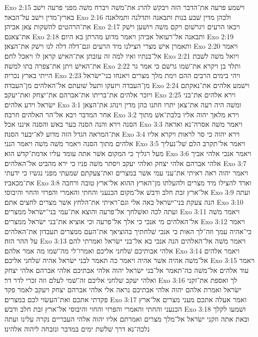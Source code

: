 Exo 2:15  וישׁמע פרעה את־הדבר הזה ויבקשׁ להרג את־משׁה ויברח משׁה מפני פרעה וישׁב בארץ־מדין וישׁב על־הבאר׃
Exo 2:16  ולכהן מדין שׁבע בנות ותבאנה ותדלנה ותמלאנה את־הרהטים להשׁקות צאן אביהן׃
Exo 2:17  ויבאו הרעים ויגרשׁום ויקם משׁה ויושׁען וישׁק את־צאנם׃
Exo 2:18  ותבאנה אל־רעואל אביהן ויאמר מדוע מהרתן בא היום׃
Exo 2:19  ותאמרן אישׁ מצרי הצילנו מיד הרעים וגם־דלה דלה לנו וישׁק את־הצאן׃
Exo 2:20  ויאמר אל־בנתיו ואיו למה זה עזבתן את־האישׁ קראן לו ויאכל לחם׃
Exo 2:21  ויואל משׁה לשׁבת את־האישׁ ויתן את־צפרה בתו למשׁה׃
Exo 2:22  ותלד בן ויקרא את־שׁמו גרשׁם כי אמר גר הייתי בארץ נכריה׃
Exo 2:23  ויהי בימים הרבים ההם וימת מלך מצרים ויאנחו בני־ישׂראל מן־העבדה ויזעקו ותעל שׁועתם אל־האלהים מן־העבדה׃
Exo 2:24  וישׁמע אלהים את־נאקתם ויזכר אלהים את־בריתו את־אברהם את־יצחק ואת־יעקב׃
Exo 2:25  וירא אלהים את־בני ישׂראל וידע אלהים׃
Exo 3:1  ומשׁה היה רעה את־צאן יתרו חתנו כהן מדין וינהג את־הצאן אחר המדבר ויבא אל־הר האלהים חרבה׃
Exo 3:2  וירא מלאך יהוה אליו בלבת־אשׁ מתוך הסנה וירא והנה הסנה בער באשׁ והסנה איננו אכל׃
Exo 3:3  ויאמר משׁה אסרה־נא ואראה את־המראה הגדל הזה מדוע לא־יבער הסנה׃
Exo 3:4  וירא יהוה כי סר לראות ויקרא אליו אלהים מתוך הסנה ויאמר משׁה משׁה ויאמר הנני׃
Exo 3:5  ויאמר אל־תקרב הלם שׁל־נעליך מעל רגליך כי המקום אשׁר אתה עומד עליו אדמת־קדשׁ הוא׃
Exo 3:6  ויאמר אנכי אלהי אביך אלהי אברהם אלהי יצחק ואלהי יעקב ויסתר משׁה פניו כי ירא מהביט אל־האלהים׃
Exo 3:7  ויאמר יהוה ראה ראיתי את־עני עמי אשׁר במצרים ואת־צעקתם שׁמעתי מפני נגשׂיו כי ידעתי את־מכאביו׃
Exo 3:8  וארד להצילו מיד מצרים ולהעלתו מן־הארץ ההוא אל־ארץ טובה ורחבה אל־ארץ זבת חלב ודבשׁ אל־מקום הכנעני והחתי והאמרי והפרזי והחוי והיבוסי׃
Exo 3:9  ועתה הנה צעקת בני־ישׂראל באה אלי וגם־ראיתי את־הלחץ אשׁר מצרים לחצים אתם׃
Exo 3:10  ועתה לכה ואשׁלחך אל־פרעה והוצא את־עמי בני־ישׂראל ממצרים׃
Exo 3:11  ויאמר משׁה אל־האלהים מי אנכי כי אלך אל־פרעה וכי אוציא את־בני ישׂראל ממצרים׃
Exo 3:12  ויאמר כי־אהיה עמך וזה־לך האות כי אנכי שׁלחתיך בהוציאך את־העם ממצרים תעבדון את־האלהים על ההר הזה׃
Exo 3:13  ויאמר משׁה אל־האלהים הנה אנכי בא אל־בני ישׂראל ואמרתי להם אלהי אבותיכם שׁלחני אליכם ואמרו־לי מה־שׁמו מה אמר אלהם׃
Exo 3:14  ויאמר אלהים אל־משׁה אהיה אשׁר אהיה ויאמר כה תאמר לבני ישׂראל אהיה שׁלחני אליכם׃
Exo 3:15  ויאמר עוד אלהים אל־משׁה כה־תאמר אל־בני ישׂראל יהוה אלהי אבתיכם אלהי אברהם אלהי יצחק ואלהי יעקב שׁלחני אליכם זה־שׁמי לעלם וזה זכרי לדר דר׃
Exo 3:16  לך ואספת את־זקני ישׂראל ואמרת אלהם יהוה אלהי אבתיכם נראה אלי אלהי אברהם יצחק ויעקב לאמר פקד פקדתי אתכם ואת־העשׂוי לכם במצרים׃
Exo 3:17  ואמר אעלה אתכם מעני מצרים אל־ארץ הכנעני והחתי והאמרי והפרזי והחוי והיבוסי אל־ארץ זבת חלב ודבשׁ׃
Exo 3:18  ושׁמעו לקלך ובאת אתה וזקני ישׂראל אל־מלך מצרים ואמרתם אליו יהוה אלהי העבריים נקרה עלינו ועתה נלכה־נא דרך שׁלשׁת ימים במדבר ונזבחה ליהוה אלהינו׃
